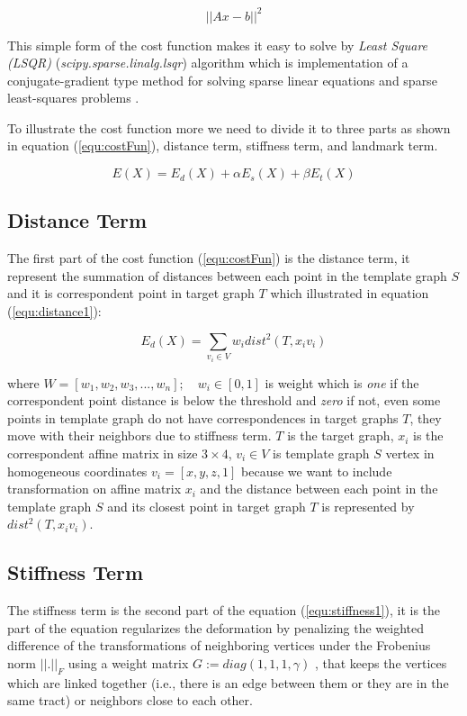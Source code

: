 \documentclass[../structure.tex]{subfiles}
\begin{document}
\begin{equation}
\label{equ:equation1}
||Ax-b||^2
\end{equation}

This simple form of the cost function makes it easy to solve by \textit{Least Square (LSQR)} (\textit{scipy.sparse.linalg.lsqr}) algorithm which is implementation of a conjugate-gradient type method for solving sparse linear equations and sparse least-squares problems \cite{Paige1982a}.

To illustrate the cost function more we need to divide it to three parts as shown in equation (\ref{equ:costFun}), distance term, stiffness term, and landmark term.

\begin{equation}
E(X) = E_{d}(X) + \alpha E_{s}(X) + \beta E_{t}(X)
\label{equ:costFun}
\end{equation}

\subsection{Distance Term}
\hspace{2em}The first part of the cost function (\ref{equ:costFun}) is the distance term, it represent the summation of distances between each point in the template graph $S$ and it is correspondent point in target graph $T$ which illustrated in equation (\ref{equ:distance1}):

\begin{equation}
E_{d}(X) = \sum_{v_{i} \in V} w_{i}dist^2(T,x_{i}v_{i})
\label{equ:distance1}
\end{equation}

where $W = [w_{1}, w_{2}, w_{3}, ..., w_{n}];\quad w_{i}\in [0,1]$ is weight which is \textit{one} if the correspondent point distance is below the threshold and \textit{zero} if not, even some points in template graph do not have correspondences in target graphs $T$, they move with their neighbors due to stiffness term. $T$ is the target graph, $x_{i}$ is the correspondent affine matrix in size $3\times4$, $v_{i}\in V$ is template graph $S$ vertex in homogeneous coordinates $v_{i} = [x,y,z,1]$ because we want to include transformation on affine matrix $x_{i}$ and the distance between each point in the template graph $S$ and its closest point in target graph $T$ is represented by $dist^2(T,x_{i}v_{i})$.



\subsection{Stiffness Term}
\hspace{2em}The stiffness term is the second part of the equation (\ref{equ:stiffness1}), it is the part of the equation regularizes the deformation by penalizing the weighted difference of the transformations of neighboring vertices under the Frobenius norm $||.||_{F}$ using a weight matrix $G := diag(1, 1, 1, \gamma)$ \cite{Amberg2007}, that keeps the vertices which are linked together (i.e., there is an edge between them or they are in the same tract) or neighbors close to each other.
\end{document}
